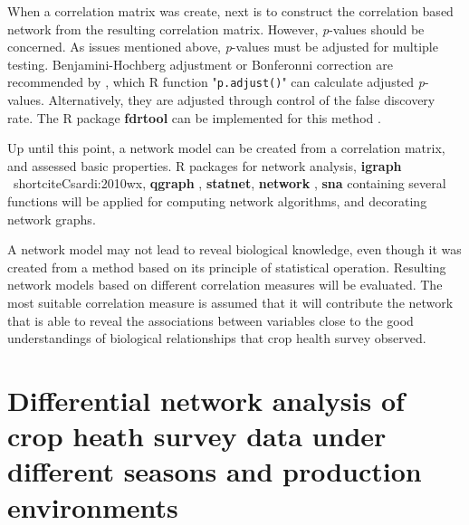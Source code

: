 When a correlation matrix was create, next is to construct the correlation based network from the resulting correlation matrix. However, \textit{p}-values should be concerned. As issues mentioned above, \textit{p}-values must be adjusted for multiple testing. Benjamini-Hochberg adjustment or Bonferonni correction are recommended by , which R function "\texttt{p.adjust()}" can calculate adjusted \textit{p}-values. Alternatively, they are adjusted through control of the false discovery rate. The R package \textbf{fdrtool} can be implemented for this method .

Up until this point, a network model can be created from a correlation matrix, and assessed basic properties. R packages for network analysis, \textbf{igraph} \ shortcite{Csardi:2010wx}, \textbf{qgraph} , \textbf{statnet}, \textbf{network} , \textbf{sna} containing several functions will be applied for  computing  network algorithms, and decorating network graphs.

A network model may not lead to reveal biological knowledge, even though it was created from a method based on its principle of statistical operation. Resulting network models based on different correlation measures will be evaluated. The most suitable correlation measure is assumed that it will contribute the network that is able to reveal the associations between variables close to the good understandings of biological relationships that crop health survey observed.  
\section*{Differential network analysis of crop heath survey data under different seasons and production environments}

